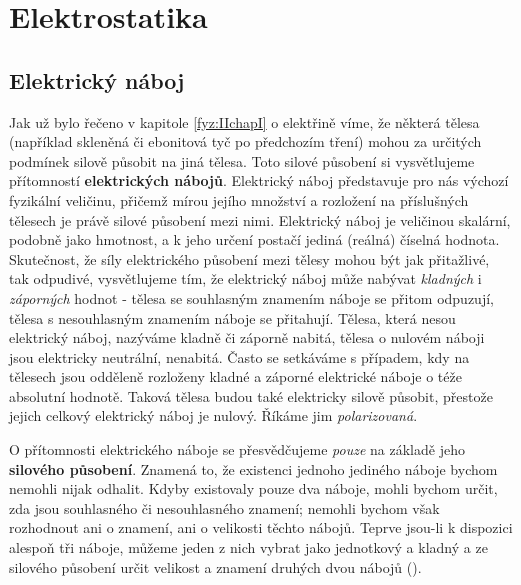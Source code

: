 \graphicspath{{../src/FYZ/img/}}
\setchaptertoc
\chapter{Elektrostatika}\label{fyz:IIIchapI}
  \section{Elektrický náboj}\label{fyz:IIIchapIsecI}
    Jak už bylo řečeno v kapitole \ref{fyz:IIchapI} o elektřině víme, že některá tělesa (například
    skleněná či ebonitová tyč po předchozím tření) mohou za určitých podmínek silově působit na jiná
    tělesa. Toto silové působení si vysvětlujeme přítomností \textbf{elektrických nábojů}.
    Elektrický náboj představuje pro nás výchozí fyzikální veličinu, přičemž mírou jejího množství a
    rozložení na příslušných tělesech je právě silové působení mezi nimi. Elektrický náboj je
    veličinou skalární, podobně jako hmotnost, a k jeho určení postačí jediná (reálná) číselná
    hodnota. Skutečnost, že síly elektrického působení mezi tělesy mohou být jak přitažlivé, tak
    odpudivé, vysvětlujeme tím, že elektrický náboj může nabývat \emph{kladných} i \emph{záporných}
    hodnot - tělesa se souhlasným znamením náboje se přitom odpuzují, tělesa s nesouhlasným znamením
    náboje se přitahují. Tělesa, která nesou elektrický náboj, nazýváme kladně či záporně nabitá,
    tělesa o nulovém náboji jsou elektricky neutrální, nenabitá. Často se setkáváme s případem, kdy
    na tělesech jsou odděleně rozloženy kladné a záporné elektrické náboje o téže absolutní hodnotě.
    Taková tělesa budou také elektricky silově působit, přestože jejich celkový elektrický náboj je
    nulový. Říkáme jim \emph{polarizovaná}. 
    
    O přítomnosti elektrického náboje se přesvědčujeme \emph{pouze} na základě jeho \textbf{silového
    působení}. Znamená to, že existenci jednoho jediného náboje bychom nemohli nijak odhalit. Kdyby
    existovaly pouze dva náboje, mohli bychom určit, zda jsou souhlasného či nesouhlasného znamení;
    nemohli bychom však rozhodnout ani o znamení, ani o velikosti těchto nábojů. Teprve jsou-li k
    dispozici alespoň tři náboje, můžeme jeden z nich vybrat jako jednotkový a kladný a ze silového
    působení určit velikost a znamení druhých dvou nábojů (\cite[s.~15]{Stoll2012}).
    
